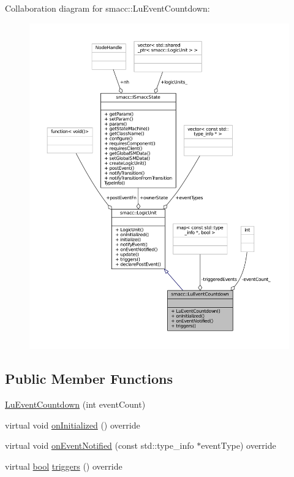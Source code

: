 Collaboration diagram for smacc\+:\+:Lu\+Event\+Countdown\+:
\nopagebreak
\begin{figure}[H]
\begin{center}
\leavevmode
\includegraphics[width=350pt]{classsmacc_1_1LuEventCountdown__coll__graph}
\end{center}
\end{figure}
\subsection*{Public Member Functions}
\begin{DoxyCompactItemize}
\item 
\hyperlink{classsmacc_1_1LuEventCountdown_a6a31eaaee2d96cdd265619741f8dd895}{Lu\+Event\+Countdown} (int event\+Count)
\item 
virtual void \hyperlink{classsmacc_1_1LuEventCountdown_a6594bd79b9f4634735181ce06d51744b}{on\+Initialized} () override
\item 
virtual void \hyperlink{classsmacc_1_1LuEventCountdown_abb66ecf93be0e2d85c476ce1c608aad1}{on\+Event\+Notified} (const std\+::type\+\_\+info $\ast$event\+Type) override
\item 
virtual \hyperlink{classbool}{bool} \hyperlink{classsmacc_1_1LuEventCountdown_a2879bea5ed88ec64e9237119a2f5397d}{triggers} () override
\end{DoxyCompactItemize}

